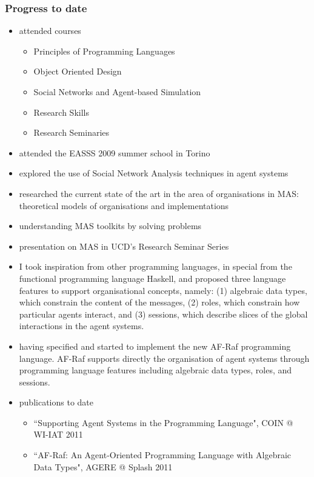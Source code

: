 \documentclass[a4paper,12pt,oneside]{book} %
\theoremstyle{remark}
\theoremstyle{plain}
\begin{document}
\subsubsection{Progress to date}

\begin{itemize}
\item attended courses
  \begin{itemize}
  \item Principles of Programming Languages
  \item Object Oriented Design
  \item Social Networks and Agent-based Simulation
  \item Research Skills
  \item Research Seminaries
  \end{itemize}
\item attended the EASSS 2009 summer school in Torino
\item explored the use of Social Network Analysis techniques in agent systems
\item
  researched the current state of the art in the area of organisations in MAS:
  theoretical models of organisations and implementations

\item understanding MAS toolkits by solving problems
\item presentation on MAS in UCD's Research Seminar Series
\item
  I took inspiration from other programming languages, in special from the
  functional programming language Haskell, and proposed three language features
  to support organisational concepts, namely: (1) algebraic data types, which
  constrain the content of the messages, (2) roles, which constrain how
  particular agents interact, and (3) sessions, which describe slices of the
  global interactions in the agent systems.

\item
  having specified and started to implement the new AF-Raf programming
  language. AF-Raf supports directly the organisation of agent systems through
  programming language features including algebraic data types, roles, and
  sessions.

\item publications to date
  \begin{itemize}
  \item ``Supporting Agent Systems in the Programming Language", COIN @ WI-IAT 2011
  \item ``AF-Raf: An Agent-Oriented Programming Language with Algebraic Data Types", AGERE @ Splash 2011
  \end{itemize}
\end{itemize}
\end{document}
